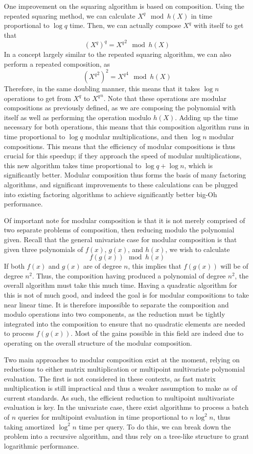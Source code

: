 \documentclass[pageno]{jpaper}
\begin{document}
One improvement on the squaring algorithm is based on composition.
Using the repeated squaring method, we can calculate $X^q \mod h(X)$ in time proportional to $\log q$ time.
Then, we can actually compose $X^q$ with itself to get that
\[(X^q)^q = {X^q}^2 \mod h(X)\]
In a concept largely similar to the repeated squaring algorithm, we can also perform a repeated composition, as 
\[\left({X^q}^2\right)^2 = {X^q}^4 \mod h(X)\]
Therefore, in the same doubling manner, this means that it takes $\log n$ operations to get from $X^q$ to ${X^q}^n$.
Note that these operations are modular compositions as previously defined, as we are composing the polynomial with itself as well as performing the operation modulo $h(X)$.
Adding up the time necessary for both operations, this means that this composition algorithm runs in time proportional to $\log q$ modular multiplications, and then $\log n$ modular compositions.
This means that the efficiency of modular compositions is thus crucial for this speedup; if they approach the speed of modular multiplications, this new algorithm takes time proportional to $\log q + \log n$, which is significantly better.
Modular composition thus forms the basis of many factoring algorithms, and significant improvements to these calculations can be plugged into existing factoring algorithms to achieve significantly better big-Oh performance.

Of important note for modular composition is that it is not merely comprised of two separate problems of composition, then reducing modulo the polynomial given.
Recall that the general univariate case for modular composition is that given three polynomials of $f(x)$, $g(x)$, and $h(x)$, we wish to calculate
\[f(g(x)) \mod h(x)\]
If both $f(x)$ and $g(x)$ are of degree $n$, this implies that $f(g(x))$ will be of degree $n^2$.
Thus, the composition having produced a polynomial of degree $n^2$, the overall algorithm must take this much time.
Having a quadratic algorithm for this is not of much good, and indeed the goal is for modular compositions to take near linear time.
It is therefore impossible to separate the composition and modulo operations into two components, as the reduction must be tightly integrated into the composition to ensure that no quadratic elements are needed to process $f(g(x))$.
Most of the gains possible in this field are indeed due to operating on the overall structure of the modular composition.

Two main approaches to modular composition exist at the moment, relying on reductions to either matrix multiplication or multipoint multivariate polynomial evaluation.
The first is not considered in these contexts, as fast matrix multiplication is still impractical and thus a weaker assumption to make as of current standards.
As such, the efficient reduction to multipoint multivariate evaluation is key.
In the univariate case, there exist algorithms to process a batch of $n$ queries for multipoint evaluation in time proportional to $n\log^2 n$, thus taking amortized $\log^2 n$ time per query.
To do this, we can break down the problem into a recursive algorithm, and thus rely on a tree-like structure to grant logarithmic performance.
\end{document}
